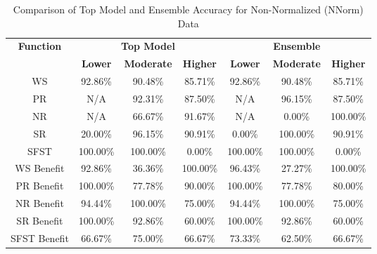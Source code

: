 \begin{table}[H]
\centering
\begin{tabular}{|c|c|c|c|c|c|c|}
\hline
\multirow{2}{*}{\textbf{Function}} & \multicolumn{3}{c|}{\textbf{Top Model}} & \multicolumn{3}{c|}{\textbf{Ensemble}} \\
\cline{2-7}
 & \textbf{Lower} & \textbf{Moderate} & \textbf{Higher} & \textbf{Lower} & \textbf{Moderate} & \textbf{Higher} \\
\hline
WS & 92.86\% & 90.48\% & 85.71\% & 92.86\% & 90.48\% & 85.71\% \\
\hline
PR & N/A & 92.31\% & 87.50\% & N/A & 96.15\% & 87.50\% \\
\hline
NR & N/A & 66.67\% & 91.67\% & N/A & 0.00\% & 100.00\% \\
\hline
SR & 20.00\% & 96.15\% & 90.91\% & 0.00\% & 100.00\% & 90.91\% \\
\hline
SFST & 100.00\% & 100.00\% & 0.00\% & 100.00\% & 100.00\% & 0.00\% \\
\hline
WS Benefit & 92.86\% & 36.36\% & 100.00\% & 96.43\% & 27.27\% & 100.00\% \\
\hline
PR Benefit & 100.00\% & 77.78\% & 90.00\% & 100.00\% & 77.78\% & 80.00\% \\
\hline
NR Benefit & 94.44\% & 100.00\% & 75.00\% & 94.44\% & 100.00\% & 75.00\% \\
\hline
SR Benefit & 100.00\% & 92.86\% & 60.00\% & 100.00\% & 92.86\% & 60.00\% \\
\hline
SFST Benefit & 66.67\% & 75.00\% & 66.67\% & 73.33\% & 62.50\% & 66.67\% \\
\hline
\end{tabular}
\caption{Comparison of Top Model and Ensemble Accuracy for Non-Normalized (NNorm) Data}
\label{reg_spec_tab:featred_non_norm_accuracy}
\end{table}

